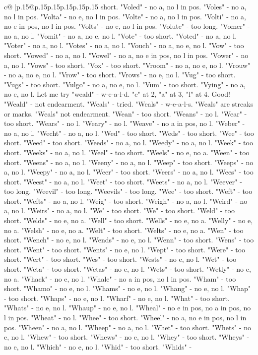 \documentclass{article}
\begin{document}
{\begin{supertabular}{c@{$\;$}|p{.15\linewidth}@{}p{.15\linewidth}p{.15\linewidth}p{.15\linewidth}p{.15\linewidth}p{.15\linewidth}}
{{{short. "Voled" {-} no a, no l in pos. "Voles" {-} no a, no l in pos. "Volta" {-} no e, no l in pos. "Volte" {-} no a, no l in pos. "Volti" {-} no a, no e in pos, no l in pos. "Volts" {-} no e, no l in pos. "Volute" {-} too long. "Vomer" {-} no a, no l. "Vomit" {-} no a, no e, no l. "Vote" {-} too short. "Voted" {-} no a, no l. "Voter" {-} no a, no l. "Votes" {-} no a, no l. "Vouch" {-} no a, no e, no l. "Vow" {-} too short. "Vowed" {-} no a, no l. "Vowel" {-} no a, no e in pos, no l in pos. "Vower" {-} no a, no l. "Vows" {-} too short. "Vox" {-} too short. "Vroom" {-} no a, no e, no l. "Vrouw" {-} no a, no e, no l. "Vrow" {-} too short. "Vrows" {-} no e, no l. "Vug" {-} too short. "Vugs" {-} too short. "Vulgo" {-} no a, no e, no l. "Vum" {-} too short. "Vying" {-} no a, no e, no l. Let me try "weald" {-} w{-}e{-}a{-}l{-}d. "e" at 2, "a" at 3, "l" at 4. Good! "Weald" {-} not endearment. "Weals" {-} tried. "Weals" {-} w{-}e{-}a{-}l{-}s. "Weals" are streaks or marks. "Weals" not endearment. "Wean" {-} too short. "Weans" {-} no l. "Wear" {-} too short. "Wears" {-} no l. "Weary" {-} no l. "Weave" {-} no a in pos, no l. "Weber" {-} no a, no l. "Wecht" {-} no a, no l. "Wed" {-} too short. "Weds" {-} too short. "Wee" {-} too short. "Weed" {-} too short. "Weeds" {-} no a, no l. "Weedy" {-} no a, no l. "Week" {-} too short. "Weeks" {-} no a, no l. "Weel" {-} too short. "Weels" {-} no e, no a. "Ween" {-} too short. "Weens" {-} no a, no l. "Weeny" {-} no a, no l. "Weep" {-} too short. "Weeps" {-} no a, no l. "Weepy" {-} no a, no l. "Weer" {-} too short. "Weers" {-} no a, no l. "Wees" {-} too short. "Weest" {-} no a, no l. "Weet" {-} too short. "Weets" {-} no a, no l. "Weever" {-} too long. "Weevil" {-} too long. "Weevils" {-} too long. "Wee" {-} too short. "Weft" {-} too short. "Wefts" {-} no a, no l. "Weig" {-} too short. "Weigh" {-} no a, no l. "Weird" {-} no a, no l. "Weirs" {-} no a, no l. "We" {-} too short. "We" {-} too short. "Weld" {-} too short. "Welds" {-} no e, no a. "Well" {-} too short. "Wells" {-} no e, no a. "Welly" {-} no e, no a. "Welsh" {-} no e, no a. "Welt" {-} too short. "Welts" {-} no e, no a. "Wen" {-} too short. "Wench" {-} no e, no l. "Wends" {-} no e, no l. "Wenn" {-} too short. "Wens" {-} too short. "Went" {-} too short. "Wents" {-} no e, no l. "Wept" {-} too short. "Were" {-} too short. "Wert" {-} too short. "Wes" {-} too short. "Wests" {-} no e, no l. "Wet" {-} too short. "Weta" {-} too short. "Wetas" {-} no e, no l. "Wets" {-} too short. "Wetly" {-} no e, no a. "Whack" {-} no e, no l. "Whale" {-} no a in pos, no l in pos. "Wham" {-} too short. "Whamo" {-} no e, no l. "Whams" {-} no e, no l. "Whang" {-} no e, no l. "Whap" {-} too short. "Whaps" {-} no e, no l. "Wharf" {-} no e, no l. "What" {-} too short. "Whats" {-} no e, no l. "Whaup" {-} no e, no l. "Wheal" {-} no e in pos, no a in pos, no l in pos. "Wheat" {-} no l. "Whee" {-} too short. "Wheel" {-} no a, no e in pos, no l in pos. "Wheen" {-} no a, no l. "Wheep" {-} no a, no l. "Whet" {-} too short. "Whets" {-} no e, no l. "Whew" {-} too short. "Whews" {-} no e, no l. "Whey" {-} too short. "Wheys" {-} no e, no l. "Which" {-} no e, no l. "Whid" {-} too short. "Whids" {-} }}}
\end{supertabular}}
\end{document}
